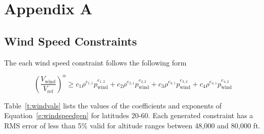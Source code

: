 \section*{Appendix A}

\subsection{Wind Speed Constraints}

The each wind speed constraint follows the following form

\begin{equation}
    \label{e:windspeedgen}
    \left(\frac{V_{\text{wind}}}{V_{\text{ref}}}\right)^{\alpha} \geq c_1 \rho^{e_{1,1}}p_{\text{wind}}^{e_{1,2}} + c_2 \rho^{e_{2,1}}p_{\text{wind}}^{e_{2,2}} + c_3 \rho^{e_{3,1}}p_{\text{wind}}^{e_{3,2}} + c_4 \rho^{e_{4,1}}p_{\text{wind}}^{e_{4,2}}
\end{equation}

Table~\ref{t:windvals} lists the values of the coefficients and exponents of Equation~\eqref{e:windspeedgen} for latitudes 20-60. Each generated constraint has a RMS error of less than 5\% valid for altitude ranges between 48,000 and 80,000 ft. 

